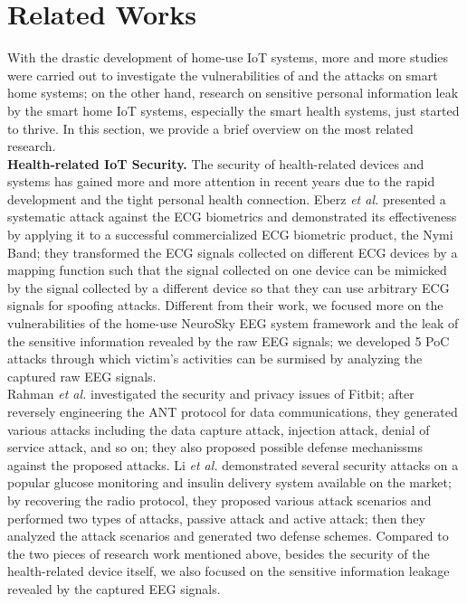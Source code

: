 \section{Related Works}
\label{sec:related}
With the drastic development of home-use IoT systems, more and more studies were carried out to investigate the vulnerabilities of and the attacks on smart home systems; on the other hand, research on sensitive personal information leak by the smart home IoT systems, especially the smart health systems, just started to thrive. In this section, we provide a brief overview on the most related research.\\
%
\indent \textbf{Health-related IoT Security.}
The security of health-related devices and systems has gained more and more attention in recent years due to the rapid development and the tight personal health connection. Eberz \emph{et al.} \cite{eberz2017broken} presented a systematic attack against the ECG biometrics and demonstrated its effectiveness by applying it to a successful commercialized ECG biometric product, the Nymi Band; they transformed the ECG signals collected on different ECG devices by a mapping function such that the signal collected on one device can be mimicked by the signal collected by a different device so that they can use arbitrary ECG signals for spoofing attacks. Different from their work, we focused more on the vulnerabilities of the home-use NeuroSky EEG system framework and the leak of the sensitive information revealed by the raw EEG signals; we developed 5 PoC attacks through which victim's activities can be surmised by analyzing the captured raw EEG signals.\\
\indent Rahman \emph{et al.} \cite{rahman2013fit} investigated the security and privacy issues of Fitbit; after reversely engineering the ANT protocol for data communications, they generated various attacks including the data capture attack, injection attack, denial of service attack, and so on; they also proposed possible defense mechanissms against the proposed attacks. Li \emph{et al.} \cite{li2011hijacking} demonstrated several security attacks on a popular glucose monitoring and insulin delivery system available on the market; by recovering the radio protocol, they proposed various attack scenarios and performed two types of attacks, passive attack and active attack; then they analyzed the attack scenarios and generated two defense schemes. Compared to the two pieces of research work mentioned above, besides the security of the health-related device itself, we also focused on the sensitive information leakage revealed by the captured EEG signals.\\
